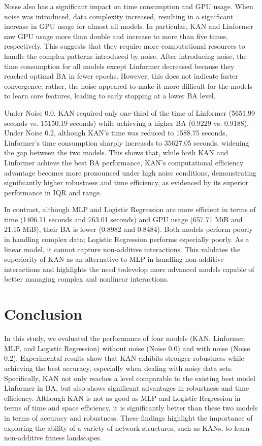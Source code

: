 \documentclass{article}
\begin{document}
Noise also has a significant impact on time consumption and GPU usage. When noise was introduced, data complexity increased, resulting in a significant increase in GPU usage for almost all models. In particular, KAN and Linformer saw GPU usage more than double and increase to more than five times, respectively. This suggests that they require more computational resources to handle the complex patterns introduced by noise. After introducing noise, the time consumption for all models except Linformer decreased because they reached optimal BA in fewer epochs. However, this does not indicate faster convergence; rather, the noise appeared to make it more difficult for the models to learn core features, leading to early stopping at a lower BA level.

Under Noise 0.0, KAN required only one-third of the time of Linformer (5651.99 seconds vs. 15150.19 seconds) while achieving a higher BA (0.9229 vs. 0.9188). Under Noise 0.2, although KAN's time was reduced to 1588.75 seconds, Linformer's time consumption sharply increasds to 35627.05 seconds, widening the gap between the two models. This shows that, while both KAN and Linformer achieve the best BA performance, KAN's computational efficiency advantage becomes more pronounced under high noise conditions, demonstrating significantly higher robustness and time efficiency, as evidenced by its superior performance in IQR and range. 

In contrast, although MLP and Logistic Regression are more efficient in terms of time (1406.11 seconds and 763.01 seconds) and GPU usage (657.71 MiB and 21.15 MiB), their BA is lower (0.8982 and 0.8484). Both models perform poorly in handling complex data; Logistic Regression  performs especially poorly. As a linear model, it cannot capture non-additive interactions. This validates the superiority of KAN as an alternative to MLP in handling non-additive interactions and highlights the need todevelop more advanced models capable of better managing complex and nonlinear interactions. 

 \section{Conclusion}
In this study, we evaluated the performance of four models (KAN, Linformer, MLP, and Logistic Regression) without noise (Noise 0.0) and with noise (Noise 0.2). Experimental results show that KAN exhibits stronger robustness while achieving the best accuracy, especially when dealing with noisy data sets. Specifically, KAN not only reaches a level comparable to the existing best model Linformer in BA, but also shows significant advantages in robustness and time efficiency. Although KAN is not as good as MLP and Logistic Regression in terms of time and space efficiency, it is significantly better than these two models in terms of accuracy and robustness. These findings highlight the importance of exploring the ability of a variety of network structures, such as KANs, to learn non-additive fitness landscapes.
\end{document}
